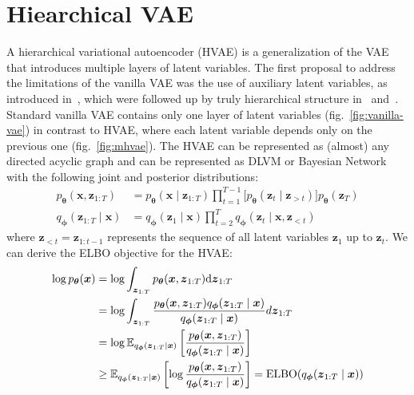 \section{Hiearchical VAE} \label{sec:hiearchical-vae}
A hierarchical variational autoencoder (HVAE) is a generalization of the VAE that introduces multiple layers of latent variables.
The first proposal to address the limitations of the vanilla VAE was the use of auxiliary latent variables, as introduced in~\cite{aux-var-2016},
which were followed up by truly hierarchical structure in~\cite{lvae-2016} and~\cite{iaf-2016}. Standard vanilla VAE contains only one layer
of latent variables (fig.~\ref{fig:vanilla-vae}) in contrast to HVAE, where each latent variable depends only on the previous one
(fig.~\ref{fig:mhvae}). The HVAE can be represented as (almost) any directed acyclic graph and can be represented as DLVM or Bayesian Network with 
the following joint and posterior distributions:
\begin{align}
    p_{\boldsymbol{\theta}}(\boldsymbol{x},\boldsymbol{z}_{1:T})&=p_{\boldsymbol{\theta}}(\boldsymbol{x}\mid\boldsymbol{z}_{1:T}) \prod_{t=1}^{T-1}\bigl[p_{\boldsymbol{\theta}}(\boldsymbol{z}_{t}\mid\boldsymbol{z}_{>t}) \bigr]  p_{\boldsymbol{\theta}}(\boldsymbol{z}_{T}) \label{eq:hvae_prior} \\
    q_{\boldsymbol{\phi}}(\boldsymbol{z}_{1:T}\mid\boldsymbol{x}) &= q_{\boldsymbol{\phi}}(\boldsymbol{z}_{1}\mid\boldsymbol{x}) \prod_{t=2}^{T}  q_{\boldsymbol{\phi}}(\boldsymbol{z}_{t}\mid \boldsymbol{x},\boldsymbol{z}_{<t}) \label{eq:hvae_posterior}
\end{align}
where $\boldsymbol{z}_{<t} = \boldsymbol{z}_{1:t-1}$ represents the sequence of all latent variables $\boldsymbol{z}_1$ up to $\boldsymbol{z}_t$. 
We can derive the ELBO objective for the HVAE: 
\begin{align}
    \log p_{\boldsymbol{\theta}}(\boldsymbol{x}) &= \log \int_{\boldsymbol{z}_{1:T}} p_{\boldsymbol{\theta}}(\boldsymbol{x},\boldsymbol{z}_{1:T}) \mbox{\rm d}\boldsymbol{z}_{1:T} \notag\\
    &= \log \int_{\boldsymbol{z}_{1:T}} \frac{p_{\boldsymbol{\theta}}(\boldsymbol{x}, \boldsymbol{z}_{1:T})q_{\boldsymbol{\phi}}(\boldsymbol{z}_{1:T}\mid \boldsymbol{x})}{q_{\boldsymbol{\phi}}(\boldsymbol{z}_{1:T}\mid\boldsymbol{x})} d\boldsymbol{z}_{1:T} \notag \\
    &= \log \operatorname{\mathbb{E}}_{q_{\boldsymbol{\phi}}(\boldsymbol{z}_{1:T}\mid\boldsymbol{x})} \left[\frac{p_{\boldsymbol{\theta}}(\boldsymbol{x}, \boldsymbol{z}_{1:T})}{q_{\boldsymbol{\phi}}(\boldsymbol{z}_{1:T}\mid\boldsymbol{x})}\right] \notag\\
    &\geq \mathbb{E}_{q_{\boldsymbol{\phi}}(\boldsymbol{z}_{1:T}\mid\boldsymbol{x})}\left[\log \frac{p_{\boldsymbol{\theta}}(\boldsymbol{x}, \boldsymbol{z}_{1:T})}{q_{\boldsymbol{\phi}}(\boldsymbol{z}_{1:T}\mid\boldsymbol{x})}\right]  = \mathrm{ELBO}(q_{\boldsymbol{\phi}}(\boldsymbol{z}_{1:T}\mid\boldsymbol{x})) \label{eq:hvae_elbo}
\end{align}

